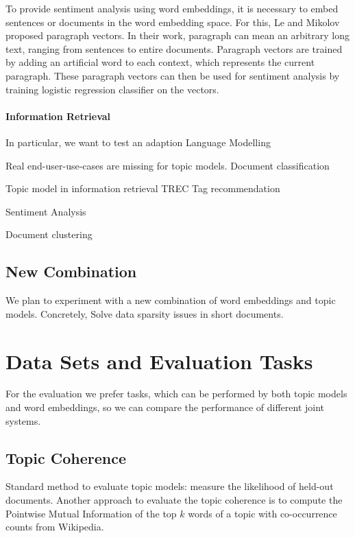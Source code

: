 \documentclass{sig-alternate-05-2015}
\begin{document}
To provide sentiment analysis using word embeddings, it is necessary to embed sentences or documents in the word embedding space.
For this, Le and Mikolov~\cite{Le2014} proposed paragraph vectors.
In their work, paragraph can mean an arbitrary long text, ranging from sentences to entire documents.
Paragraph vectors are trained by adding an artificial word to each context, which represents the current paragraph.
These paragraph vectors can then be used for sentiment analysis by training logistic regression classifier on the vectors.


\paragraph{Information Retrieval}

In particular, we want to test an adaption
Language Modelling

Real end-user-use-cases are missing for topic models.
Document classification

Topic model in information retrieval
TREC
Tag recommendation

Sentiment Analysis
\cite{Wei2006}

Document clustering

\subsection{New Combination}
We plan to experiment with a new combination of word embeddings and topic models.
Concretely, 
Solve data sparsity issues in short documents.

\section{Data Sets and Evaluation Tasks}
\label{sec:data-sets-and-evaluation}

For the evaluation we prefer tasks, which can be performed by both topic models and word embeddings, so we can compare the performance of different joint systems.

\subsection{Topic Coherence}
Standard method to evaluate topic models: measure the likelihood of held-out documents.
Another approach to evaluate the topic coherence is to compute the Pointwise Mutual Information of the top $k$ words of a topic with co-occurrence counts from Wikipedia.
\end{document}

